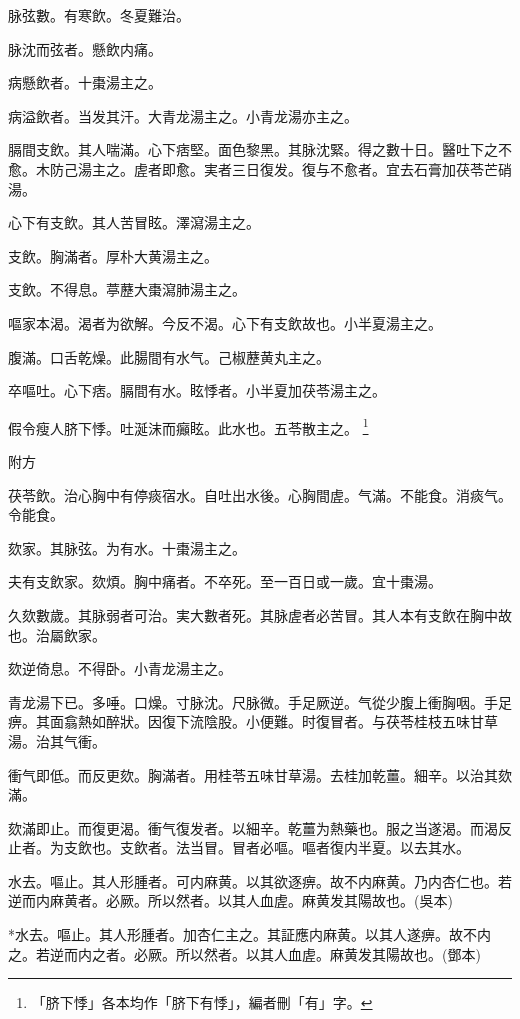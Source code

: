 \documentclass[b5paper,twoside,zihao=-4,UTF8]{ctexbook}
\begin{document}
脉弦數。有寒飲。冬夏難治。

脉沈而弦者。懸飲内痛。

病懸飲者。十棗湯主之。

病溢飲者。当发其汗。大青龙湯主之。小青龙湯亦主之。

膈間支飲。其人喘滿。心下痞堅。面色黎黑。其脉沈緊。得之數十日。醫吐下之不愈。木防己湯主之。虗者即愈。実者三日復发。復与不愈者。宜去石膏加茯苓芒硝湯。

心下有支飲。其人苦冒眩。澤瀉湯主之。

支飲。胸滿者。厚朴大黄湯主之。

支飲。不得息。葶藶大棗瀉肺湯主之。

嘔家本渴。渴者为欲解。今反不渴。心下有支飲故也。小半夏湯主之。

腹滿。口舌乾燥。此腸間有水气。己椒藶黄丸主之。

卒嘔吐。心下痞。膈間有水。眩悸者。{小}半夏加茯苓湯主之。

假令瘦人脐下悸。吐涎沫而癲眩。此水也。五苓散主之。
	\footnote{「脐下悸」各本均作「脐下有悸」，編者刪「有」字。}

附方

茯苓飲。治心胸中有停痰宿水。自吐出水後。心胸間虗。气滿。不能食。消痰气。令能食。

欬家。其脉弦。为有水。十棗湯主之。

夫有支飲家。欬煩。胸中痛者。不卒死。至一百日{或}一歲。宜十棗湯。

久欬數歲。其脉弱者可治。実大數者死。其脉虗者必苦冒。其人本有支飲在胸中故也。治屬飲家。

欬逆倚息。{不得卧。}小青龙湯主之。

青龙湯下已。多唾。口燥。寸脉沈。尺脉微。手足厥逆。气從少腹上衝胸咽。手足痹。其面翕熱如醉狀。因復下流陰股。小便難。时復冒者。与茯苓桂枝五味甘草湯。治其气衝。

衝气即低。而反更欬。胸滿者。用桂苓五味甘草湯。去桂加乾薑。細辛。以治其欬滿。

欬滿即止。而復更渴。衝气復发者。以細辛。乾薑为熱藥也。服之当遂渴。而渴反止者。为支飲也。支飲者。法当冒。冒者必嘔。嘔者復内半夏。以去其水。

水去。嘔止。其人形腫者。可内麻黄。以其欲逐痹。故不内麻黄。乃内杏仁也。若逆而内麻黄者。必厥。所以然者。以其人血虗。麻黄发其陽故也。(吳本)

*水去。嘔止。其人形腫者。加杏仁主之。其証應内麻黄。以其人遂痹。故不内之。若逆而内之者。必厥。所以然者。以其人血虗。麻黄发其陽故也。(鄧本)
\end{document}
